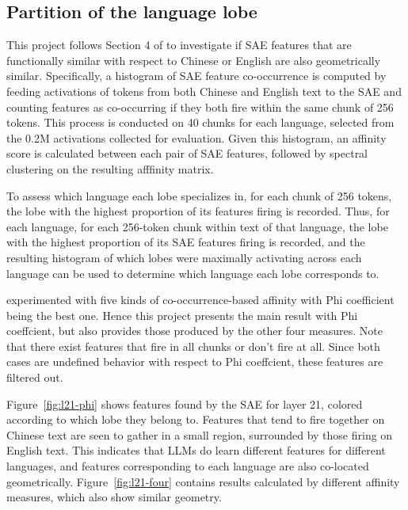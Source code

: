 \documentclass{article}
\begin{document}
\subsection{Partition of the language lobe}
\label{sec:part-lang-lobe}

This project follows Section 4 of \cite{li2024Geometry} to investigate if SAE features that are
functionally similar with respect to Chinese or English are also geometrically
similar. Specifically, a histogram of SAE feature co-occurrence is computed by feeding activations
of tokens from both Chinese and English text to the SAE and counting features as co-occurring if
they both fire within the same chunk of 256 tokens. This process is conducted on 40 chunks for each
language, selected from the 0.2M activations collected for evaluation. Given this histogram, an
affinity score is calculated between each pair of SAE features, followed by spectral clustering on
the resulting afffinity matrix.

To assess which language each lobe specializes in, for each chunk of 256 tokens, the lobe with the
highest proportion of its features firing is recorded. Thus, for each language, for each 256-token
chunk within text of that language, the lobe with the highest proportion of its SAE features firing
is recorded, and the resulting histogram of which lobes were maximally activating across each
language can be used to determine which language each lobe corresponds to.

\cite{li2024Geometry} experimented with five kinds of co-occurrence-based affinity with Phi
coefficient being the best one. Hence this project presents the main result with Phi coeffcient, but
also provides those produced by the other four measures. Note that there exist features that fire in
all chunks or don't fire at all. Since both cases are undefined behavior with respect to Phi
coeffcient, these features are filtered out.

Figure~\ref{fig:l21-phi} shows features found by the SAE for layer 21, colored according to which
lobe they belong to. Features that tend to fire together on Chinese text are seen to gather in a
small region, surrounded by those firing on English text. This indicates that LLMs do learn
different features for different languages, and features corresponding to each language are also
co-located geometrically. Figure~\ref{fig:l21-four} contains results calculated by different
affinity measures, which also show similar geometry.
\end{document}
